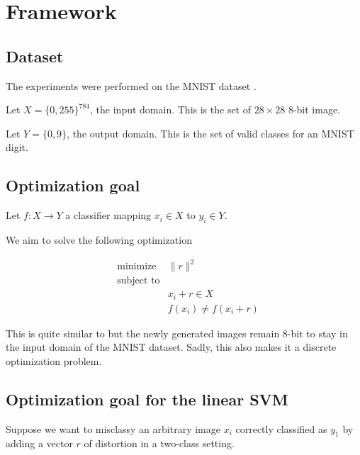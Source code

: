 \documentclass{article} %
\begin{document}
\section{Framework}


\subsection{Dataset}

The experiments were performed on the MNIST dataset \citep{lecun_mnist_1998}.

Let \begin{math} X=\{0, 255\}^{784} \end{math}, the input domain.
This is the set of $28\times28$ 8-bit image.

Let \begin{math} Y = \{0, 9\} \end{math}, the output domain.
This is the set of valid classes for an MNIST digit.


\subsection{Optimization goal}

Let \begin{math} f:X \rightarrow  Y \end{math} a classifier mapping $x_i \in
X$ to $y_i \in Y$.

We aim to solve the following optimization

\begin{equation}
\label{eq:optimization}
\begin{aligned}
& {\text{minimize}}
&   \lVert{r} \rVert^2\\
& \text{subject to} \\
& & x_i + r \in X \\
& & f(x_i) \neq f(x_i + r)
\end{aligned}
\end{equation}

This is quite similar to \citep{szegedy_intriguing_2013} but the newly
generated images remain 8-bit to stay in the input domain of the MNIST dataset.
Sadly, this also makes it a discrete optimization problem.


\subsection{Optimization goal for the linear SVM}

Suppose we want to misclassy an arbitrary image $x_i$ correctly classified
as $y_1$ by adding a vector $r$ of distortion in a two-class setting.
\end{document}
